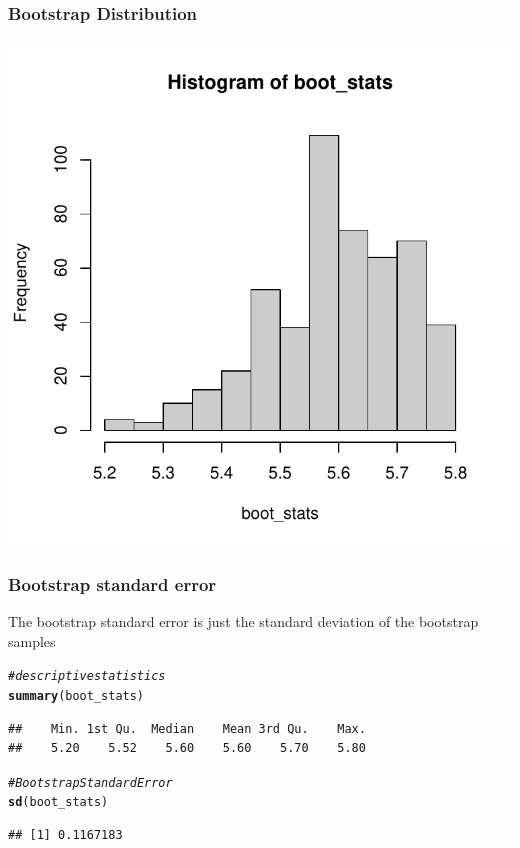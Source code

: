 \documentclass[12pt]{beamer}\usepackage[]{graphicx}\usepackage[]{color}
\makeatletter
\newcommand{\hlcom}[1]{\textcolor[rgb]{0.678,0.584,0.686}{\textit{#1}}}%
\newcommand{\hlstd}[1]{\textcolor[rgb]{0.345,0.345,0.345}{#1}}%
\newcommand{\hlkwd}[1]{\textcolor[rgb]{0.737,0.353,0.396}{\textbf{#1}}}%
\newenvironment{kframe}{%
 \def\at@end@of@kframe{}%
 \ifinner\ifhmode%
  \def\at@end@of@kframe{\end{minipage}}%
  \begin{minipage}{\columnwidth}%
 \fi\fi%
 \def\FrameCommand##1{\hskip\@totalleftmargin \hskip-\fboxsep
 \colorbox{shadecolor}{##1}\hskip-\fboxsep
     \hskip-\linewidth \hskip-\@totalleftmargin \hskip\columnwidth}%
 \MakeFramed {\advance\hsize-\width
   \@totalleftmargin\z@ \linewidth\hsize
   \@setminipage}}%
 {\par\unskip\endMakeFramed%
 \at@end@of@kframe}
\newenvironment{knitrout}{}{} %
\makeatother
\begin{document}

\begin{frame}[fragile]
\frametitle{Bootstrap Distribution}

\begin{knitrout}\footnotesize
{}\color{fgcolor}

{\centering \includegraphics[width=.7\linewidth,height=.7\linewidth]{figure/unnamed-chunk-14-1} 

}



\end{knitrout}

\end{frame}


\begin{frame}[fragile]
\frametitle{Bootstrap standard error}

The bootstrap standard error is just the standard deviation of the bootstrap samples
\begin{knitrout}\footnotesize
{}\color{fgcolor}\begin{kframe}
\begin{alltt}
\hlcom{# descriptive statistics}
\hlkwd{summary}\hlstd{(boot_stats)}
\end{alltt}
\begin{verbatim}
##    Min. 1st Qu.  Median    Mean 3rd Qu.    Max. 
##    5.20    5.52    5.60    5.60    5.70    5.80
\end{verbatim}
\begin{alltt}
\hlcom{# Bootstrap Standard Error}
\hlkwd{sd}\hlstd{(boot_stats)}
\end{alltt}
\begin{verbatim}
## [1] 0.1167183
\end{verbatim}
\end{kframe}
\end{knitrout}

\end{frame}

\end{document}
